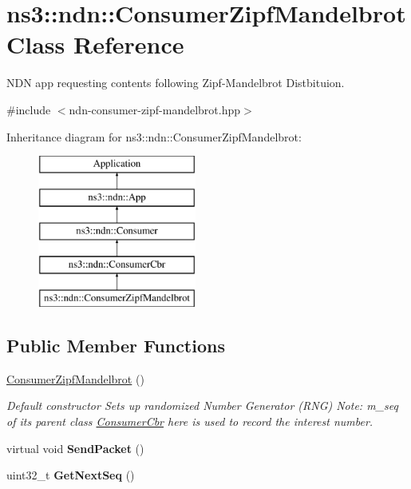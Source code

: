 \hypertarget{classns3_1_1ndn_1_1ConsumerZipfMandelbrot}{}\section{ns3\+:\+:ndn\+:\+:Consumer\+Zipf\+Mandelbrot Class Reference}
\label{classns3_1_1ndn_1_1ConsumerZipfMandelbrot}


N\+DN app requesting contents following Zipf-\/\+Mandelbrot Distbituion.  




{\ttfamily \#include $<$ndn-\/consumer-\/zipf-\/mandelbrot.\+hpp$>$}

Inheritance diagram for ns3\+:\+:ndn\+:\+:Consumer\+Zipf\+Mandelbrot\+:\begin{figure}[H]
\begin{center}
\leavevmode
\includegraphics[height=5.000000cm]{classns3_1_1ndn_1_1ConsumerZipfMandelbrot}
\end{center}
\end{figure}
\subsection*{Public Member Functions}
\begin{DoxyCompactItemize}
\item 
\hyperlink{classns3_1_1ndn_1_1ConsumerZipfMandelbrot_aef3ebccd91bcf32d17de416311f7bc83}{Consumer\+Zipf\+Mandelbrot} ()\hypertarget{classns3_1_1ndn_1_1ConsumerZipfMandelbrot_aef3ebccd91bcf32d17de416311f7bc83}{}\label{classns3_1_1ndn_1_1ConsumerZipfMandelbrot_aef3ebccd91bcf32d17de416311f7bc83}

\begin{DoxyCompactList}\small\item\em Default constructor Sets up randomized Number Generator (R\+NG) Note\+: m\+\_\+seq of its parent class \hyperlink{classns3_1_1ndn_1_1ConsumerCbr}{Consumer\+Cbr} here is used to record the interest number. \end{DoxyCompactList}\item 
virtual void {\bfseries Send\+Packet} ()\hypertarget{classns3_1_1ndn_1_1ConsumerZipfMandelbrot_acc29540414473c1d1f355454ff544091}{}\label{classns3_1_1ndn_1_1ConsumerZipfMandelbrot_acc29540414473c1d1f355454ff544091}

\item 
uint32\+\_\+t {\bfseries Get\+Next\+Seq} ()\hypertarget{classns3_1_1ndn_1_1ConsumerZipfMandelbrot_a8d93b3de80f5ca21c529288f556e6c7b}{}\label{classns3_1_1ndn_1_1ConsumerZipfMandelbrot_a8d93b3de80f5ca21c529288f556e6c7b}

\end{DoxyCompactItemize}
